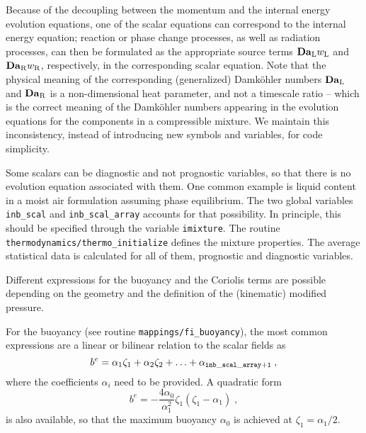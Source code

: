 Because of the decoupling between the momentum and the internal energy evolution equations, one of the scalar equations can correspond to the internal energy equation; reaction or phase change processes, as well as radiation processes, can then be formulated as the appropriate source terms $\mathrm{\bf   Da}_\mathrm{L}w_\mathrm{L}$ and $\mathrm{\bf Da}_\mathrm{R}w_\mathrm{R}$, respectively, in the corresponding scalar equation. Note that the physical meaning of the corresponding (generalized) Damk{\"o}hler numbers $\mathrm{\bf   Da}_\mathrm{L}$ and $\mathrm{\bf Da}_\mathrm{R}$ is a non-dimensional heat parameter, and not a timescale ratio -- which is the correct meaning of the Damk{\"o}hler numbers appearing in the evolution equations for the components in a compressible mixture. We maintain this inconsistency, instead of introducing new symbols and variables, for code simplicity.

Some scalars can be diagnostic and not prognostic variables, so that there is no evolution equation associated with them. One common example is liquid content in a moist air formulation assuming phase equilibrium. The two global variables {\tt inb\_scal} and {\tt inb\_scal\_array} accounts for that possibility. In principle, this should be specified through the variable {\tt imixture}. The routine {\tt thermodynamics/thermo\_initialize} defines the mixture properties. The average statistical data is calculated for all of them, prognostic and diagnostic variables.

Different expressions for the buoyancy and the Coriolis terms are possible depending on the geometry and the definition of the (kinematic) modified pressure.

For the buoyancy (see routine {\tt mappings/fi\_buoyancy}), the most common expressions are a linear or bilinear relation to the scalar fields as
\begin{equation}
  b^e=\alpha_1\zeta_1+\alpha_2\zeta_2+\ldots+\alpha_\mathrm{\tt inb\_scal\_array+1}\;,
\end{equation}
where the coefficients $\alpha_i$ need to be provided. A quadratic form
\begin{equation}
  b^e=-\frac{4\alpha_0}{\alpha_1^2}\zeta_1(\zeta_1-\alpha_1) \;,
\end{equation}
is also available, so that the maximum buoyancy $\alpha_0$ is achieved at
$\zeta_1=\alpha_1/2$.

